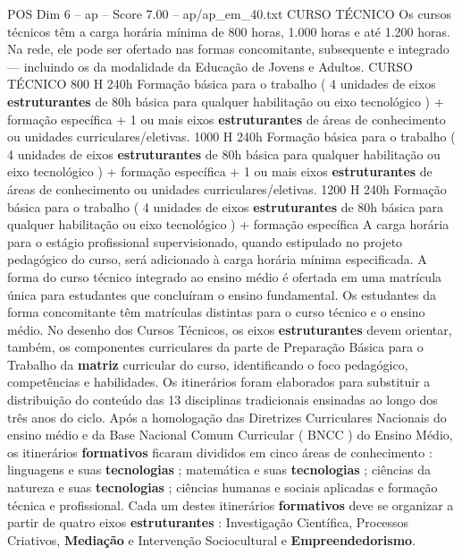 \begin{textsample}{POS Dim 6 – ap – Score 7.00 – ap/ap\_em\_40.txt}  \label{ex:f6_pos_109}
CURSO TÉCNICO Os cursos técnicos têm a carga horária mínima de 800 horas, 1.000 horas e até 1.200 horas.
Na rede, ele pode ser ofertado nas formas concomitante, subsequente e integrado — incluindo os da modalidade da Educação de Jovens e Adultos.
CURSO TÉCNICO 800 H 240h Formação básica para o trabalho ( 4 unidades de eixos \textbf{estruturantes} de 80h básica para qualquer habilitação ou eixo tecnológico ) + formação específica + 1 ou mais eixos \textbf{estruturantes} de áreas de conhecimento ou unidades curriculares/eletivas. 1000 H 240h Formação básica para o trabalho ( 4 unidades de eixos \textbf{estruturantes} de 80h básica para qualquer habilitação ou eixo tecnológico ) + formação específica + 1 ou mais eixos \textbf{estruturantes} de áreas de conhecimento ou unidades curriculares/eletivas. 1200 H 240h Formação básica para o trabalho ( 4 unidades de eixos \textbf{estruturantes} de 80h básica para qualquer habilitação ou eixo tecnológico ) + formação específica A carga horária para o estágio profissional supervisionado, quando estipulado no projeto pedagógico do curso, será adicionado à carga horária mínima especificada.
A forma do curso técnico integrado ao ensino médio é ofertada em uma matrícula única para estudantes que concluíram o ensino fundamental.
Os estudantes da forma concomitante têm matrículas distintas para o curso técnico e o ensino médio.
No desenho dos Cursos Técnicos, os eixos \textbf{estruturantes} devem orientar, também, os componentes curriculares da parte de Preparação Básica para o Trabalho da \textbf{matriz} curricular do curso, identificando o foco pedagógico, competências e habilidades.
Os itinerários foram elaborados para substituir a distribuição do conteúdo das 13 disciplinas tradicionais ensinadas ao longo dos três anos do ciclo.
Após a homologação das Diretrizes Curriculares Nacionais do ensino médio e da Base Nacional Comum Curricular ( BNCC ) do Ensino Médio, os itinerários \textbf{formativos} ficaram divididos em cinco áreas de conhecimento : linguagens e suas \textbf{tecnologias} ; matemática e suas \textbf{tecnologias} ; ciências da natureza e suas \textbf{tecnologias} ; ciências humanas e sociais aplicadas e formação técnica e profissional.
Cada um destes itinerários \textbf{formativos} deve se organizar a partir de quatro eixos \textbf{estruturantes} : Investigação Científica, Processos Criativos, \textbf{Mediação} e Intervenção Sociocultural e \textbf{Empreendedorismo}.

\end{textsample}
